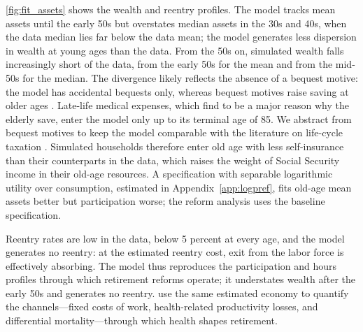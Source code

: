\autoref{fig:fit_assets} shows the wealth and reentry profiles. The model tracks mean assets until the early 50s but overstates median assets in the 30s and 40s, when the data median lies far below the data mean; the model generates less dispersion in wealth at young ages than the data. From the 50s on, simulated wealth falls increasingly short of the data, from the early 50s for the mean and from the mid-50s for the median. The divergence likely reflects the absence of a bequest motive: the model has accidental bequests only, whereas bequest motives raise saving at older ages \citep{lockwood2018incidental}. Late-life medical expenses, which \citet{Denardi2010} find to be a major reason why the elderly save, enter the model only up to its terminal age of 85. We abstract from bequest motives to keep the model comparable with the literature on life-cycle taxation \citep{farhi2013insurance,golosov2016redistribution,Stantcheva2017}. Simulated households therefore enter old age with less self-insurance than their counterparts in the data, which raises the weight of Social Security income in their old-age resources. A specification with separable logarithmic utility over consumption, estimated in Appendix~\ref{app:logpref}, fits old-age mean assets better but participation worse; the reform analysis uses the baseline specification.

Reentry rates are low in the data, below 5 percent at every age, and the model generates no reentry: at the estimated reentry cost, exit from the labor force is effectively absorbing. The model thus reproduces the participation and hours profiles through which retirement reforms operate; it understates wealth after the early 50s and generates no reentry. \citet{NdiayeYu2026frot} use the same estimated economy to quantify the channels---fixed costs of work, health-related productivity losses, and differential mortality---through which health shapes retirement.

